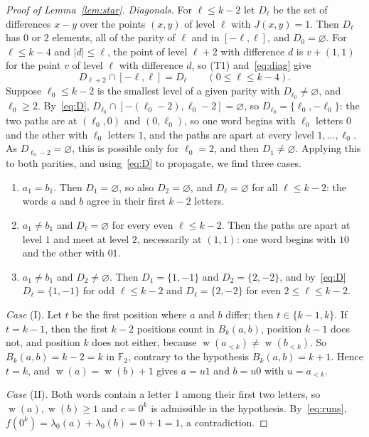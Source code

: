 \documentclass[11pt]{amsart}
\theoremstyle{definition}
\theoremstyle{remark}
\numberwithin{equation}{section}
\newcommand{\F}{\mathbb{F}}
\DeclareMathOperator{\wt}{w}
\begin{document}
\begin{proof}[Proof of Lemma~\ref{lem:star}]
\emph{Diagonals.} For $\ell\le k-2$ let $D_\ell$ be the set of differences $x-y$ over the points $(x,y)$ of level $\ell$ with $J(x,y)=1$. Then $D_\ell$ has $0$ or $2$ elements, all of the parity of $\ell$ and in $[-\ell,\ell]$, and $D_0=\varnothing$. For $\ell\le k-4$ and $|d|\le\ell$, the point of level $\ell+2$ with difference $d$ is $v+(1,1)$ for the point $v$ of level $\ell$ with difference $d$, so (T1) and~\eqref{eq:diag} give
\begin{equation}\label{eq:D}
D_{\ell+2}\cap[-\ell,\ell]=D_\ell\qquad(0\le\ell\le k-4).
\end{equation}
Suppose $\ell_0\le k-2$ is the smallest level of a given parity with $D_{\ell_0}\ne\varnothing$, and $\ell_0\ge2$. By~\eqref{eq:D}, $D_{\ell_0}\cap[-(\ell_0-2),\ell_0-2]=\varnothing$, so $D_{\ell_0}=\{\ell_0,-\ell_0\}$: the two paths are at $(\ell_0,0)$ and $(0,\ell_0)$, so one word begins with $\ell_0$ letters $0$ and the other with $\ell_0$ letters $1$, and the paths are apart at every level $1,\dots,\ell_0$. As $D_{\ell_0-2}=\varnothing$, this is possible only for $\ell_0=2$, and then $D_1\ne\varnothing$. Applying this to both parities, and using~\eqref{eq:D} to propagate, we find three cases.
\begin{enumerate}[label=(\Roman*)]
\item $a_1=b_1$. Then $D_1=\varnothing$, so also $D_2=\varnothing$, and $D_\ell=\varnothing$ for all $\ell\le k-2$: the words $a$ and $b$ agree in their first $k-2$ letters.
\item $a_1\ne b_1$ and $D_\ell=\varnothing$ for every even $\ell\le k-2$. Then the paths are apart at level $1$ and meet at level $2$, necessarily at $(1,1)$: one word begins with $10$ and the other with $01$.
\item $a_1\ne b_1$ and $D_2\ne\varnothing$. Then $D_1=\{1,-1\}$ and $D_2=\{2,-2\}$, and by~\eqref{eq:D} $D_\ell=\{1,-1\}$ for odd $\ell\le k-2$ and $D_\ell=\{2,-2\}$ for even $2\le\ell\le k-2$.
\end{enumerate}

\emph{Case} (I). Let $t$ be the first position where $a$ and $b$ differ; then $t\in\{k-1,k\}$. If $t=k-1$, then the first $k-2$ positions count in $B_k(a,b)$, position $k-1$ does not, and position $k$ does not either, because $\wt(a_{<k})\ne\wt(b_{<k})$. So $B_k(a,b)=k-2=k$ in $\F_2$, contrary to the hypothesis $B_k(a,b)=k+1$. Hence $t=k$, and $\wt(a)=\wt(b)+1$ gives $a=u1$ and $b=u0$ with $u=a_{<k}$.

\emph{Case} (II). Both words contain a letter $1$ among their first two letters, so $\wt(a),\wt(b)\ge1$ and $c=0^k$ is admissible in the hypothesis. By~\eqref{eq:runs}, $f(0^k)=\lambda_0(a)+\lambda_0(b)=0+1=1$, a contradiction.


\end{proof}
\end{document}
